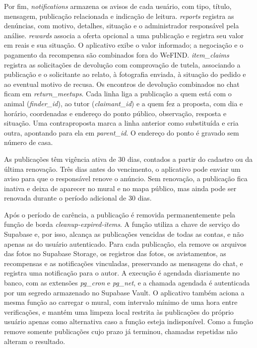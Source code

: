 Por fim, \textit{notifications} armazena os avisos de cada usuário, com tipo, título, mensagem, publicação relacionada e indicação de leitura. \textit{reports} registra as denúncias, com motivo, detalhes, situação e o administrador responsável pela análise. \textit{rewards} associa a oferta opcional a uma publicação e registra seu valor em reais e sua situação. O aplicativo exibe o valor informado; a negociação e o pagamento da recompensa são combinados fora do WeFIND. \textit{item\_claims} registra as solicitações de devolução com comprovação de tutela, associando a publicação e o solicitante ao relato, à fotografia enviada, à situação do pedido e ao eventual motivo de recusa. Os encontros de devolução combinados no chat ficam em \textit{return\_meetups}. Cada linha liga a publicação a quem está com o animal (\textit{finder\_id}), ao tutor (\textit{claimant\_id}) e a quem fez a proposta, com dia e horário, coordenadas e endereço do ponto público, observação, resposta e situação. Uma contraproposta marca a linha anterior como substituída e cria outra, apontando para ela em \textit{parent\_id}. O endereço do ponto é gravado sem número de casa.

As publicações têm vigência ativa de 30 dias, contados a partir do cadastro ou da última renovação. Três dias antes do vencimento, o aplicativo pode enviar um aviso para que o responsável renove o anúncio. Sem renovação, a publicação fica inativa e deixa de aparecer no mural e no mapa público, mas ainda pode ser renovada durante o período adicional de 30 dias.

Após o período de carência, a publicação é removida permanentemente pela função de borda \textit{cleanup-expired-items}. A função utiliza a chave de serviço do Supabase e, por isso, alcança as publicações vencidas de todas as contas, e não apenas as do usuário autenticado. Para cada publicação, ela remove os arquivos das fotos no Supabase Storage, os registros das fotos, os avistamentos, as recompensas e as notificações vinculadas, preservando as mensagens do chat, e registra uma notificação para o autor. A execução é agendada diariamente no banco, com as extensões \textit{pg\_cron} e \textit{pg\_net}, e a chamada agendada é autenticada por um segredo armazenado no Supabase Vault. O aplicativo também aciona a mesma função ao carregar o mural, com intervalo mínimo de uma hora entre verificações, e mantém uma limpeza local restrita às publicações do próprio usuário apenas como alternativa caso a função esteja indisponível. Como a função remove somente publicações cujo prazo já terminou, chamadas repetidas não alteram o resultado.

